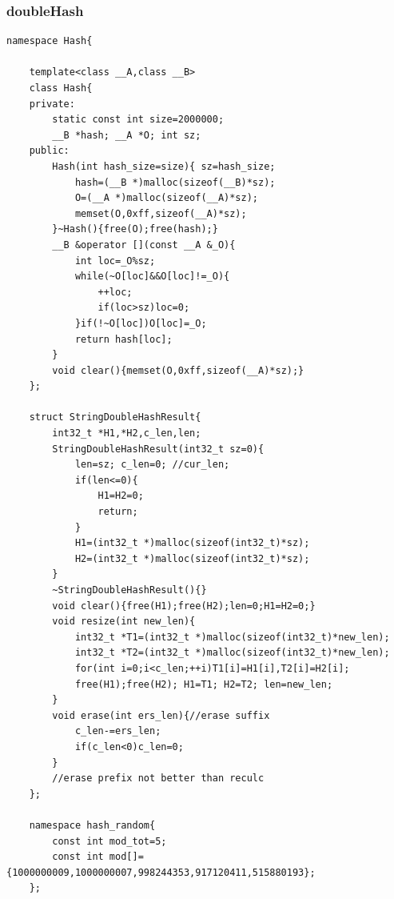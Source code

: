 \documentclass[twoside]{article}
\begin{document}
\subsubsection{doubleHash}
\begin{lstlisting}
namespace Hash{

    template<class __A,class __B>
    class Hash{
    private:
        static const int size=2000000;
        __B *hash; __A *O; int sz;
    public:
        Hash(int hash_size=size){ sz=hash_size;
            hash=(__B *)malloc(sizeof(__B)*sz);
            O=(__A *)malloc(sizeof(__A)*sz);
            memset(O,0xff,sizeof(__A)*sz);
        }~Hash(){free(O);free(hash);}
        __B &operator [](const __A &_O){
            int loc=_O%sz;
            while(~O[loc]&&O[loc]!=_O){
                ++loc;
                if(loc>sz)loc=0;
            }if(!~O[loc])O[loc]=_O;
            return hash[loc];
        }
        void clear(){memset(O,0xff,sizeof(__A)*sz);}
    };

    struct StringDoubleHashResult{
        int32_t *H1,*H2,c_len,len;
        StringDoubleHashResult(int32_t sz=0){
            len=sz; c_len=0; //cur_len;
            if(len<=0){
                H1=H2=0;
                return;
            }
            H1=(int32_t *)malloc(sizeof(int32_t)*sz);
            H2=(int32_t *)malloc(sizeof(int32_t)*sz);
        }
        ~StringDoubleHashResult(){}
        void clear(){free(H1);free(H2);len=0;H1=H2=0;}
        void resize(int new_len){
            int32_t *T1=(int32_t *)malloc(sizeof(int32_t)*new_len);
            int32_t *T2=(int32_t *)malloc(sizeof(int32_t)*new_len);
            for(int i=0;i<c_len;++i)T1[i]=H1[i],T2[i]=H2[i];
            free(H1);free(H2); H1=T1; H2=T2; len=new_len;
        }
        void erase(int ers_len){//erase suffix
            c_len-=ers_len;
            if(c_len<0)c_len=0;
        }
        //erase prefix not better than reculc
    };

    namespace hash_random{
        const int mod_tot=5;
        const int mod[]={1000000009,1000000007,998244353,917120411,515880193};
    };


\end{lstlisting}
\end{document}
